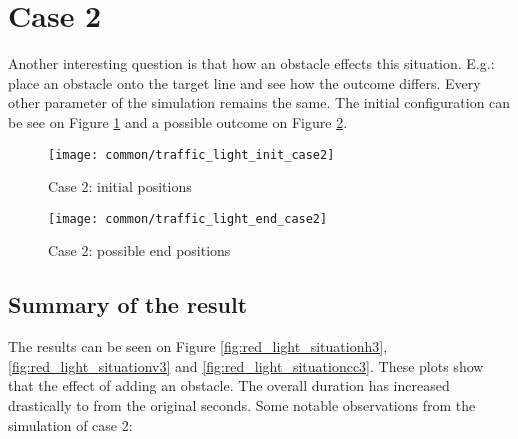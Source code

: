 		\section{Case 2}
			Another interesting question is that how an obstacle effects this situation. E.g.: place an obstacle onto the target line and see how the outcome differs. Every other parameter of the simulation remains the same. The initial configuration can be see on Figure \ref{fig:traffic_light_init2} and a possible outcome on Figure \ref{fig:traffic_light_end2}.
			\begin{figure}
				\centering
				\texttt{[image: common/traffic\_light\_init\_case2]}
				\caption{Case 2: initial positions}
				\label{fig:traffic_light_init2}
			\end{figure}
			\begin{figure}
				\centering
				\texttt{[image: common/traffic\_light\_end\_case2]}
				\caption{Case 2: possible end positions}
				\label{fig:traffic_light_end2}
			\end{figure}
			\subsection*{Summary of the result}
			The results can be seen on Figure \ref{fig:red_light_situationh3}, \ref{fig:red_light_situationv3} and \ref{fig:red_light_situationcc3}. These plots show that the effect of adding an obstacle. The overall duration has increased drastically to from the original seconds.
			Some notable observations from the simulation of case 2:
			
